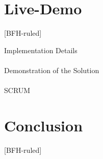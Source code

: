 \documentclass[
    ngerman,%
    authorontitle=true,
]{bfhbeamer}
\begin{document}
	\section{Live-Demo}
	[BFH-ruled]
	\frame{\sectionpage}


	\begin{frame}{Implementation Details}
		\framesubtitle{}
	\end{frame}


	\begin{frame}{Demonstration of the Solution}
		\framesubtitle{}
	\end{frame}

	\begin{frame}{SCRUM}
		\framesubtitle{}
	\end{frame}

    \section{Conclusion}
	[BFH-ruled]
	\frame{\sectionpage}
\end{document}
